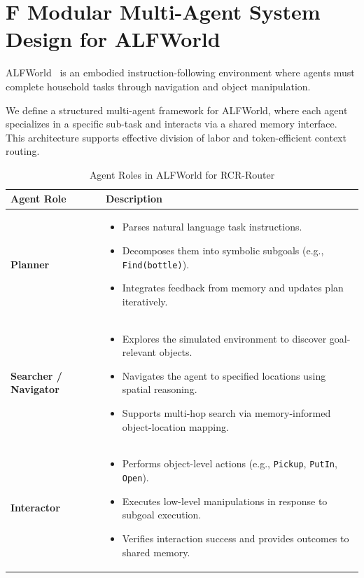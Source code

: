 \section{F \quad  Modular Multi-Agent System Design for ALFWorld}
ALFWorld~\cite{ALFWorld20} is an embodied instruction-following environment where agents must complete household tasks through navigation and object manipulation.

We define a structured multi-agent framework for ALFWorld, where each agent specializes in a specific sub-task and interacts via a shared memory interface. This architecture supports effective division of labor and token-efficient context routing.

\begin{table}[h]
\centering
\caption{Agent Roles in ALFWorld for RCR-Router}
\label{tab:alfworld_roles_detailed}
\begin{tabular}{l|p{11.2cm}}
\toprule
\textbf{Agent Role} & \textbf{Description} \\
\midrule
\textbf{Planner} &
\begin{itemize}
  \item Parses natural language task instructions.
  \item Decomposes them into symbolic subgoals (e.g., \texttt{Find(bottle)}).
  \item Integrates feedback from memory and updates plan iteratively.
\end{itemize}
\\
\hline
\textbf{Searcher / Navigator} &
\begin{itemize}
  \item Explores the simulated environment to discover goal-relevant objects.
  \item Navigates the agent to specified locations using spatial reasoning.
  \item Supports multi-hop search via memory-informed object-location mapping.
\end{itemize}
\\
\hline
\textbf{Interactor} &
\begin{itemize}
  \item Performs object-level actions (e.g., \texttt{Pickup}, \texttt{PutIn}, \texttt{Open}).
  \item Executes low-level manipulations in response to subgoal execution.
  \item Verifies interaction success and provides outcomes to shared memory.
\end{itemize}
\\
\bottomrule
\end{tabular}
\end{table}





